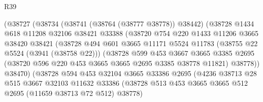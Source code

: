 \begin{lexlean}{R39}
\begin{coremodule}
                          (@38727
                            (@38734
                              (@38741 (@38764 (@38777 @38778)) @38442)
                              (@38728
                                @1434
                                @618
                                @11208
                                @32106
                                @38421
                                @33388
                                (@38720
                                  @754
                                  @220
                                  @1433
                                  @11206
                                  @3665
                                  @38420
                                  @38421
                                  (@38728
                                    @494
                                    @601
                                    @3665
                                    @11171
                                    @5524
                                    @11783
                                    (@38755 @22 @5524 (@3941 (@38758 @22)))
                                    (@38728
                                      @599
                                      @453
                                      @3667
                                      @3665
                                      @3385
                                      @2695
                                      (@38720 @596 @220 @453 @3665 @3665 @2695 @3385 @38778 @11821)
                                      @38778))
                                  @38470)
                                (@38728
                                  @594
                                  @453
                                  @32104
                                  @3665
                                  @33386
                                  @2695
                                  (@4236
                                    @38713
                                    @28
                                    @515
                                    @3667
                                    @32103
                                    @11632
                                    @33386
                                    (@38728
                                      @513
                                      @453
                                      @3665
                                      @3665
                                      @512
                                      @2695
                                      (@11659 @38713 @72 @512)
                                      @38778)

\end{coremodule}
\end{lexlean}
